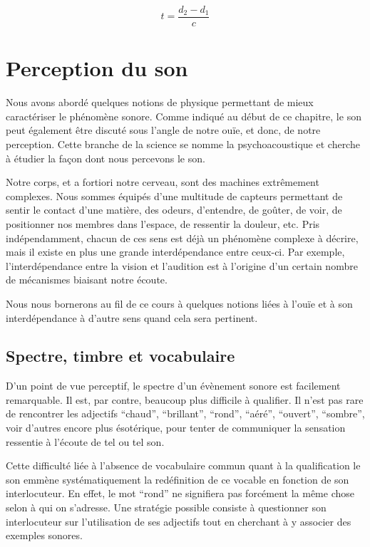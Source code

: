 \documentclass[
]{book}
\begin{document}
\[ t = \frac {d_2-d_1}{c}\]

\hypertarget{perception-du-son}{%
\section{Perception du son}\label{perception-du-son}}

Nous avons abordé quelques notions de physique permettant de mieux caractériser le phénomène sonore. Comme indiqué au début de ce chapitre, le son peut également être discuté sous l'angle de notre ouïe, et donc, de notre perception. Cette branche de la science se nomme la psychoacoustique et cherche à étudier la façon dont nous percevons le son.

Notre corps, et a fortiori notre cerveau, sont des machines extrêmement complexes. Nous sommes équipés d'une multitude de capteurs permettant de sentir le contact d'une matière, des odeurs, d'entendre, de goûter, de voir, de positionner nos membres dans l'espace, de ressentir la douleur, etc. Pris indépendamment, chacun de ces sens est déjà un phénomène complexe à décrire, mais il existe en plus une grande interdépendance entre ceux-ci. Par exemple, l'interdépendance entre la vision et l'audition est à l'origine d'un certain nombre de mécanismes biaisant notre écoute.

Nous nous bornerons au fil de ce cours à quelques notions liées à l'ouïe et à son interdépendance à d'autre sens quand cela sera pertinent.

\hypertarget{spectre-timbre-et-vocabulaire}{%
\subsection{Spectre, timbre et vocabulaire}\label{spectre-timbre-et-vocabulaire}}

D'un point de vue perceptif, le spectre d'un évènement sonore est facilement remarquable. Il est, par contre, beaucoup plus difficile à qualifier. Il n'est pas rare de rencontrer les adjectifs ``chaud'', ``brillant'', ``rond'', ``aéré'', ``ouvert'', ``sombre'', voir d'autres encore plus ésotérique, pour tenter de communiquer la sensation ressentie à l'écoute de tel ou tel son.

Cette difficulté liée à l'absence de vocabulaire commun quant à la qualification le son emmène systématiquement la redéfinition de ce vocable en fonction de son interlocuteur. En effet, le mot ``rond'' ne signifiera pas forcément la même chose selon à qui on s'adresse. Une stratégie possible consiste à questionner son interlocuteur sur l'utilisation de ses adjectifs tout en cherchant à y associer des exemples sonores.
\end{document}
